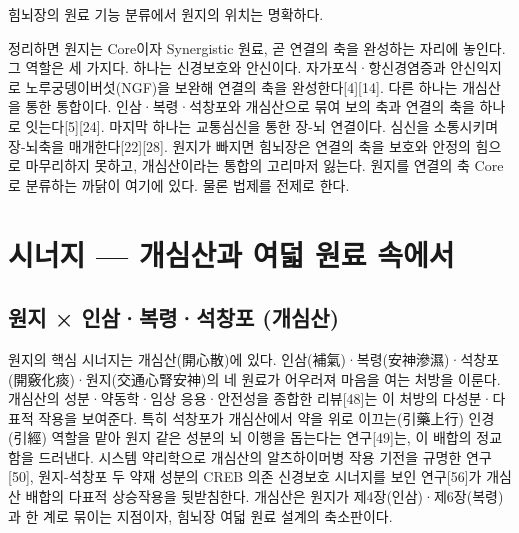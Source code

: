 \documentclass[12pt,oneside]{book}
\begin{document}
힘뇌장의 원료 기능 분류에서 원지의 위치는 명확하다.

\vspace{2pt}\vspace{3pt}

정리하면 원지는 Core이자 Synergistic 원료, 곧 연결의 축을 완성하는 자리에 놓인다. 그 역할은 세 가지다. 하나는 신경보호와 안신이다. 자가포식·항신경염증과 안신익지로 노루궁뎅이버섯(NGF)을 보완해 연결의 축을 완성한다[4][14]. 다른 하나는 개심산을 통한 통합이다. 인삼·복령·석창포와 개심산으로 묶여 보의 축과 연결의 축을 하나로 잇는다[5][24]. 마지막 하나는 교통심신을 통한 장-뇌 연결이다. 심신을 소통시키며 장-뇌축을 매개한다[22][28]. 원지가 빠지면 힘뇌장은 연결의 축을 보호와 안정의 힘으로 마무리하지 못하고, 개심산이라는 통합의 고리마저 잃는다. 원지를 연결의 축 Core로 분류하는 까닭이 여기에 있다. 물론 법제를 전제로 한다.

\section{시너지 — 개심산과 여덟 원료 속에서}

\subsection{원지 × 인삼·복령·석창포 (개심산)}

원지의 핵심 시너지는 개심산(開心散)에 있다. 인삼(補氣)·복령(安神滲濕)·석창포(開竅化痰)·원지(交通心腎安神)의 네 원료가 어우러져 마음을 여는 처방을 이룬다. 개심산의 성분·약동학·임상 응용·안전성을 종합한 리뷰[48]는 이 처방의 다성분·다표적 작용을 보여준다. 특히 석창포가 개심산에서 약을 위로 이끄는(引藥上行) 인경(引經) 역할을 맡아 원지 같은 성분의 뇌 이행을 돕는다는 연구[49]는, 이 배합의 정교함을 드러낸다. 시스템 약리학으로 개심산의 알츠하이머병 작용 기전을 규명한 연구[50], 원지-석창포 두 약재 성분의 CREB 의존 신경보호 시너지를 보인 연구[56]가 개심산 배합의 다표적 상승작용을 뒷받침한다. 개심산은 원지가 제4장(인삼)·제6장(복령)과 한 계로 묶이는 지점이자, 힘뇌장 여덟 원료 설계의 축소판이다.
\end{document}
